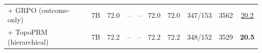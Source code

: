 \begin{table}[!htb]
{\begin{tabular}{@{}l c c c c c c c c c@{}}
\quad + GRPO (outcome-only)          & 7B & 72.0           & --             & --             & 72.0           & 72.0 & 347/153 & 3562 & \underline{20.2} \\
\rowcolor{blue!5}
\quad + TopoPRM (hierarchical)       & 7B & 72.2           & --             & --             & 72.2           & 72.2 & 348/152 & 3529 & \textbf{20.5} \\
\bottomrule
\end{tabular}%
}
\end{table}

